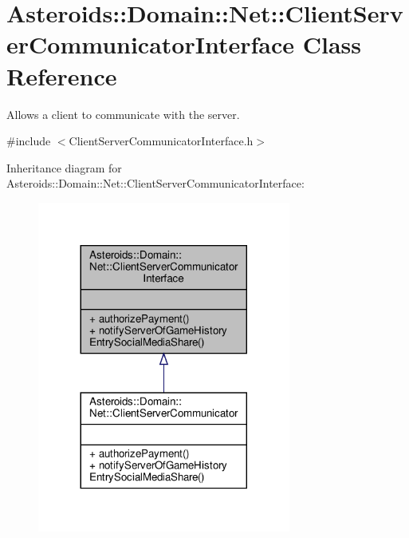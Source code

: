 \hypertarget{classAsteroids_1_1Domain_1_1Net_1_1ClientServerCommunicatorInterface}{}\section{Asteroids\+:\+:Domain\+:\+:Net\+:\+:Client\+Server\+Communicator\+Interface Class Reference}
\label{classAsteroids_1_1Domain_1_1Net_1_1ClientServerCommunicatorInterface}


Allows a client to communicate with the server.  




{\ttfamily \#include $<$Client\+Server\+Communicator\+Interface.\+h$>$}



Inheritance diagram for Asteroids\+:\+:Domain\+:\+:Net\+:\+:Client\+Server\+Communicator\+Interface\+:\nopagebreak
\begin{figure}[H]
\begin{center}
\leavevmode
\includegraphics[width=236pt]{classAsteroids_1_1Domain_1_1Net_1_1ClientServerCommunicatorInterface__inherit__graph}
\end{center}
\end{figure}


